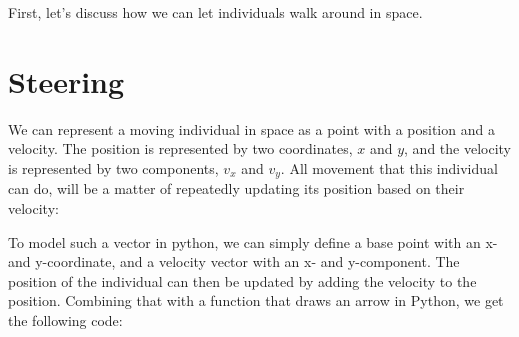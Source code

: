 \documentclass[
  letterpaper,
  DIV=11,
  numbers=noendperiod]{scrreprt}
\theoremstyle{definition}
\theoremstyle{remark}
\begin{document}
First, let's discuss how we can let individuals walk around in space.

\section{Steering}\label{steering}

We can represent a moving individual in space as a point with a position
and a velocity. The position is represented by two coordinates, \(x\)
and \(y\), and the velocity is represented by two components, \(v_x\)
and \(v_y\). All movement that this individual can do, will be a matter
of repeatedly updating its position based on their velocity:

To model such a vector in python, we can simply define a base point with
an x- and y-coordinate, and a velocity vector with an x- and
y-component. The position of the individual can then be updated by
adding the velocity to the position. Combining that with a function that
draws an arrow in Python, we get the following code:
\end{document}
